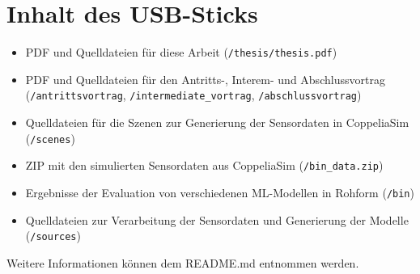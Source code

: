 \chapter{Inhalt des USB-Sticks}
\begin{itemize}
    \item PDF und Quelldateien für diese Arbeit (\texttt{/thesis/thesis.pdf})
    \item PDF und Quelldateien für den Antritts-, Interem- und Abschlussvortrag (\texttt{/antrittsvortrag}, \texttt{/intermediate\_vortrag}, \texttt{/abschlussvortrag})
    \item Quelldateien für die Szenen zur Generierung der Sensordaten in CoppeliaSim (\texttt{/scenes})
    \item ZIP mit den simulierten Sensordaten aus CoppeliaSim (\texttt{/bin\_data.zip})
    \item Ergebnisse der Evaluation von verschiedenen ML-Modellen in Rohform (\texttt{/bin})
    \item Quelldateien zur Verarbeitung der Sensordaten und Generierung der Modelle (\texttt{/sources})
\end{itemize}
Weitere Informationen können dem README.md entnommen werden.